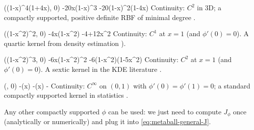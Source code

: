 { \max\left((1-x)^4(1+4x), 0\right) }
{ -20x(1-x)^3 }
{ -20(1-x)^2(1-4x) }
{  }
{  }
{Continuity: $C^2$ in 3D; a compactly supported, positive definite RBF of minimal degree \cite{Wendland1995}.}

{ \max\left((1-x^2)^2, 0\right) }
{ -4x(1-x^2) }
{ -4+12x^2 }
{  }
{  }
{Continuity: $C^1$ at $x=1$ (and $\phi'(0)=0$). A quartic kernel from density estimation \cite{Silverman1998, Wand1993}).}

{ \max\left((1-x^2)^3, 0\right) }
{ -6x(1-x^2)^2 }
{ -6(1-x^2)(1-5x^2) }
{  }
{  }
{Continuity: $C^2$ at $x=1$ (and $\phi'(0)=0$). A sextic kernel in the KDE literature \cite{Silverman1998,Wand1993}.}

{ \max\left(, 0\right) }
{ -\sin(\pi x) }
{ -\cos(\pi x) }
{ - }
{  }
{Continuity: $C^\infty$ on $(0,1)$ with $\phi'(0)=\phi'(1)=0$; a standard compactly supported kernel in statistics \cite{Soh2013}.}

Any other compactly supported $\phi$ can be used: we just need to compute $J_\phi$ once (analytically or numerically) and plug it into \eqref{eq:metaball-general-J}.